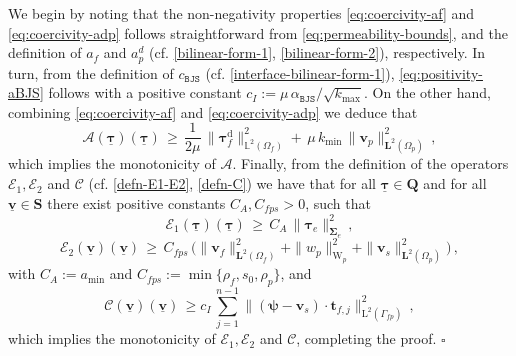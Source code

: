 \documentclass[11pt]{article}
\numberwithin{equation}{section}
\newcommand{\bSigma}{{\boldsymbol\Sigma}}
\newcommand{\bpsi}{{\boldsymbol\psi}}
\newcommand{\btau}{{\boldsymbol\tau}}
\newcommand{\ubtau}{\underline{\btau}}
\newcommand{\ubv}{\underline{\bv}}
\newcommand{\bv}{{\mathbf{v}}}
\newcommand{\bt}{{\mathbf{t}}}
\newcommand{\0}{{\mathbf{0}}}
\def\bQ{\mathbf{Q}}
\def\bS{\mathbf{S}}
\newcommand{\bL}{\mathbf{L}}
\newcommand\bbL{\mathbb{L}}
\newcommand{\cA}{\mathcal{A}}
\newcommand{\cC}{\mathcal{C}}
\newcommand{\cE}{\mathcal{E}}
\def\L{\mathrm{L}}
\def\W{\mathrm{W}}
\def\rd{\mathrm{d}}
\def\BJS{\mathtt{BJS}}
\newenvironment{proof}{\noindent{\it Proof.}}{\hfill$\square$}
\numberwithin{equation}{section}
\begin{document}
\begin{proof}
We begin by noting that the non-negativity properties \eqref{eq:coercivity-af} and \eqref{eq:coercivity-adp} follows straightforward from \eqref{eq:permeability-bounds}, and the definition of $a_f$ and $a^d_p$ (cf. \eqref{bilinear-form-1}, \eqref{bilinear-form-2}), respectively.
In turn, from the definition of $c_\BJS$ (cf. \eqref{interface-bilinear-form-1}), \eqref{eq:positivity-aBJS} follows with a positive constant $c_I:= \mu\,\alpha_{\BJS}/\sqrt{ k_{\max}}$.
On the other hand, combining \eqref{eq:coercivity-af} and \eqref{eq:coercivity-adp} we deduce that 
\begin{equation}\label{eq: operator A-monotone}
\cA(\ubtau)(\ubtau) 
\,\geq\, \frac{1}{2\mu}\,\|\btau^\rd_f\|^2_{\bbL^2(\Omega_f)} + \, \mu\,k_{\min}\,\|\bv_p\|^2_{\bL^2(\Omega_p)} \,,
\end{equation}
which implies the monotonicity of $\cA$. Finally, from the definition of the operators $\cE_1, \cE_2$ and $\cC$ (cf. \eqref{defn-E1-E2}, \eqref{defn-C}) we have that for all $\ubtau\in \bQ$ and for all $\ubv\in \bS$ there exist positive constants $C_A, C_{fps}>0$, such that
\begin{equation}\label{eq: operator E_1-monotone}
\cE_1(\ubtau)(\ubtau) 
\,\geq\, C_A\,\|\btau_e\|^2_{\bSigma_e} \,,
\end{equation}
%
\begin{equation}\label{eq: operator E_2-monotone}
\cE_2(\ubv)(\ubv) \,\geq\, C_{fps}\,\Big( \|\bv_f\|^2_{\bL^2(\Omega_f)} + \|w_p\|^2_{\W_p}+\|\bv_s\|^2_{\bL^2(\Omega_p)}  \Big)\,,
\end{equation}
with $C_A:= a_{\min}$ and $C_{fps}:=\min\{\rho_f,s_0,\rho_p\}$, and
\begin{equation}\label{eq: operator C-monotone}
\cC(\ubv)(\ubv) 
\,\geq c_I\,\sum^{n-1}_{j=1} \|( \bpsi-\bv_s)\cdot\bt_{f,j}\|^2_{\L^2(\Gamma_{fp})} \,,
\end{equation}
which implies the monotonicity of $\cE_1, \cE_2$ and $\cC$, completing the proof.
\end{proof}
\end{document}
